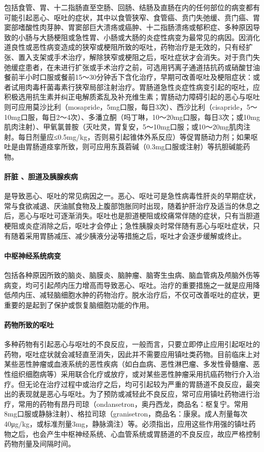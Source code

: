 包括食管、胃、十二指肠直至空肠、回肠、结肠及直肠在内的任何部位的病变都有可能引起恶心、呕吐的症状，其中以食管狭窄、食管癌、贲门失弛缓、贲门癌、胃窦部嗜酸性肉芽肿、胃窦部巨大溃疡或癌肿、十二指肠溃疡或郁积症、多种原因导致的小肠与大肠梗阻或急性胃、小肠或大肠的炎症性病变为最常见的病因。因消化道良性或恶性病变造成的狭窄或梗阻所致的呕吐，药物治疗是无效的，只有经扩张、置入支架或手术治疗，解除狭窄或梗阻之后，呕吐症状才会消失。对于贲门失弛缓症患者，在未进行扩张或手术治疗之前，可选用钙离子通道拮抗药或硝酸甘油餐前半小时口服或餐前15～30分钟舌下含化治疗，早期可改善呕吐及梗阻症状：或者试用肉毒杆菌毒素行狭窄局部注射治疗。胃肠道急性炎症性病变引起的呕吐，应积极选用抗生素并纠正电解质紊乱及补充维生素；胃肠动力障碍引起的恶心与呕吐则可应用莫沙比利（mosapride，5mg口服，每日3次）、西沙比利（cisapride，5～10mg口服，每日2～4次）、多潘立酮（吗丁啉，10～20mg口服，每日3次；或10mg肌肉注射）、甲氧氯普胺（灭吐灵，胃复安，5～10mg口服；或10～20mg肌肉注射。每日剂量应≤0.5mg/kg，否则易引起锥体外系反应）等促胃肠动力剂；如果呕吐是由胃肠道痉挛所致，则可应用东莨菪碱（0.3mg口服或注射）等抗胆碱能药物。

\paragraph{肝脏 、胆道及胰腺疾病}

是导致恶心、呕吐的常见病因之一。恶心、呕吐可是急性病毒性肝炎的早期症状，常与食欲减退、厌油腻食物及上腹部饱胀同时出现，随着护肝治疗及适当的休息之后，恶心与呕吐可逐渐消失。呕吐也是胆道梗阻或绞痛常伴随的症状，只有当胆道梗阻或炎症消除之后，呕吐才会停止；急性胰腺炎时常伴随有恶心与呕吐症状，只有随着采用胃肠减压、减少胰液分泌等措施之后，呕吐才会逐步缓解或终止。

\paragraph{中枢神经系统病变}

包括各种原因所致的脑炎、脑膜炎、脑肿瘤、脑寄生虫病、脑血管病及颅脑外伤等病变，均可引起颅内压力增高而导致恶心、呕吐。治疗的重要措施之一就是应用降低颅内压、减轻脑细胞水肿的药物治疗。脱水治疗后，不仅可改善呕吐的症状，更重要的是起到了保护或恢复脑细胞功能的作用。

\paragraph{药物所致的呕吐}

多种药物有引起恶心与呕吐的不良反应，一般而言，只要立即停止应用引起呕吐的药物，呕吐症状就会减轻直至消失，因此并不需要应用镇吐类药物。目前临床上对某些恶性肿瘤或血液系统的恶性疾病（如白血病、恶性淋巴瘤、多发性骨髓瘤、恶性组织细胞病等）采用联合化疗或放疗，或对某些恶性肿瘤采用抗癌药物行介入治疗。但无论在治疗过程中或治疗之后，均可引起较为严重的胃肠道不良反应，最突出的表现就是恶心与呕吐。为了预防或减轻此不良反应，常可应用镇吐药物进行治疗，常用的药物有昂丹司琼（ondansetron，奥丹西龙，商品名：枢复宁。常用8mg口服或静脉注射）、格拉司琼（granisetron，商品名：康泉。成人剂量每次40μg/kg，或标准剂量3mg，静脉滴注）等。必须指出，应用这些作用强的镇吐药物之后，也会产生中枢神经系统、心血管系统或胃肠道的不良反应，故应严格控制药物剂量及间隔时间。

